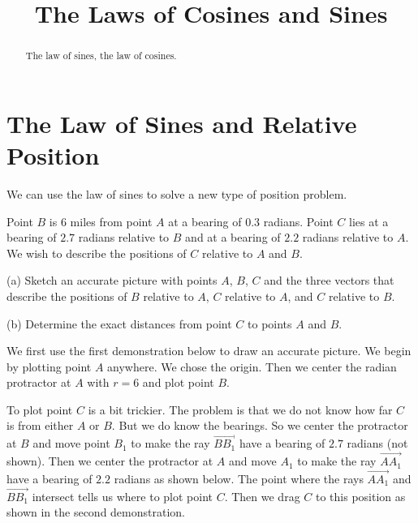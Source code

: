 \documentclass{ximera}
\title{The Laws of Cosines and Sines}
\begin{document}
\begin{abstract}
The law of sines, the law of cosines.
\end{abstract}
\maketitle


\section{The Law of Sines and Relative Position}
We can use the law of sines to solve a new type of position problem.

\begin{example}  \label{Exer748gtgb}
Point $B$ is $6$ miles from point $A$ at a bearing of $0.3$ radians. Point $C$ lies at a bearing of $2.7$ radians relative to $B$ and at a bearing of $2.2$ radians relative to $A$. We wish to describe the positions of $C$ relative to $A$ and $B$.


(a) Sketch an accurate picture with points $A$, $B$, $C$ and the three vectors that describe the positions of $B$ relative to $A$, $C$ relative to $A$, and $C$ relative to $B$.

(b) Determine the exact distances from point $C$ to points $A$ and $B$.

\begin{explanation}
We first use the first demonstration below to draw an accurate picture. We begin by plotting point $A$ anywhere. We chose the origin. Then we center the radian protractor at $A$ with $r=6$ and plot point $B$.

To plot point $C$ is a bit trickier. The problem is that we do not know how far $C$ is from either $A$ or $B$. But we do know the bearings. So we center the protractor at $B$ and move point $B_1$ to make the ray $\overrightarrow{BB_1}$ have a bearing of $2.7$ radians (not shown). Then we center the protractor at $A$ and move $A_1$ to make the ray $\overrightarrow{AA_1}$ have a bearing of $2.2$ radians as shown below. The point where the rays $\overrightarrow{AA_1}$ and $\overrightarrow{BB_1}$ intersect tells us where to plot point $C$.  Then we drag $C$ to this position as shown in the second demonstration.

 
\begin{onlineOnly}
    \begin{center}
\end{center}
\end{onlineOnly}


\end{explanation}
\end{example}
\end{document}
